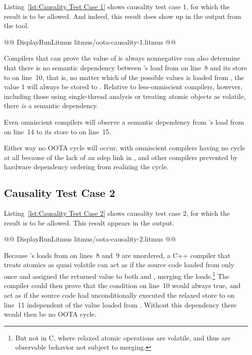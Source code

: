\documentclass[10]{article}
\begin{document}
Listing~\ref{lst:Causality Test Case 1}
shows causality test case 1, for which the  result
is to be allowed.
And indeed, this result does show up in the output from the  tool.

\begin{listing}[tbp]
@@ DisplayRunLitmus litmus/oota-causality-1.litmus @@
\caption{Causality Test Case 1}
\label{lst:Causality Test Case 1}
\end{listing}

Compilers that can prove the value of  is always
nonnegative can also determine that there is no semantic dependency between
's load from  on line~8 and its store to  on line~10,
that is, no matter which of the possible values is loaded from ,
the value 1 will always be stored to .
Relative to less-omniscient compilers, however,
including those using single-thread analysis or treating atomic
objects as volatile, there \emph{is} a semantic dependency.

Even omniscient compilers will observe a semantic dependency from
's load from  on line~14 to its store to  on line~15.

Either way no OOTA cycle will occur, with omniscient compilers
having no cycle at all because of the lack of an sdep link in ,
and other compilers prevented by hardware
dependency ordering from realizing the cycle.

\subsection{Causality Test Case 2}
\label{app:Causality Test Case 2}

Listing~\ref{lst:Causality Test Case 2}
shows causality test case 2, for which the  result
is to be allowed.
This result appears in the  output.

\begin{listing}[tbp]
@@ DisplayRunLitmus litmus/oota-causality-2.litmus @@
\caption{Causality Test Case 2}
\label{lst:Causality Test Case 2}
\end{listing}

Because 's loads from  on lines~8 and~9 are unordered,
a C++ compiler that treats atomics as quasi volatile
can act as if the source code loaded from  only
once and assigned the returned value to both  and ,
merging the loads.\footnote{
	But not in C, where relaxed atomic operations are volatile,
	and thus are observable behavior not subject to merging.}
The compiler could then prove that the condition on line~10
would always true, and act as if the source code had
unconditionally executed the relaxed store to  on line~11
independent of the value loaded from .
Without this dependency there would then be no OOTA cycle.
\end{document}
